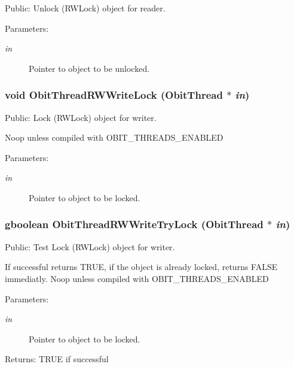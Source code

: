 Public: Unlock (RWLock) object for reader. 

\begin{Desc}
\item[Parameters:]
\begin{description}
\item[{\em in}]Pointer to object to be unlocked. \end{description}
\end{Desc}
\subsubsection{\setlength{\rightskip}{0pt plus 5cm}void Obit\-Thread\-RWWrite\-Lock ({\bf Obit\-Thread} $\ast$ {\em in})}\label{ObitThread_8c_a13}


Public: Lock (RWLock) object for writer. 

Noop unless compiled with OBIT\_\-THREADS\_\-ENABLED \begin{Desc}
\item[Parameters:]
\begin{description}
\item[{\em in}]Pointer to object to be locked. \end{description}
\end{Desc}
\subsubsection{\setlength{\rightskip}{0pt plus 5cm}gboolean Obit\-Thread\-RWWrite\-Try\-Lock ({\bf Obit\-Thread} $\ast$ {\em in})}\label{ObitThread_8c_a14}


Public: Test Lock (RWLock) object for writer. 

If successful returns TRUE, if the object is already locked, returns FALSE immediatly. Noop unless compiled with OBIT\_\-THREADS\_\-ENABLED \begin{Desc}
\item[Parameters:]
\begin{description}
\item[{\em in}]Pointer to object to be locked. \end{description}
\end{Desc}
\begin{Desc}
\item[Returns:]TRUE if successful \end{Desc}
